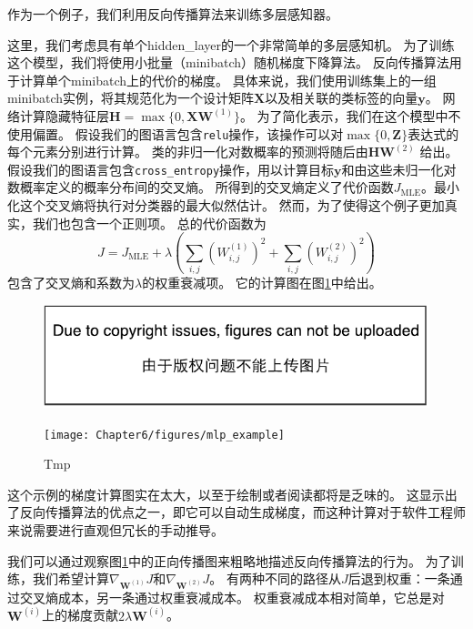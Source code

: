 作为一个例子，我们利用反向传播算法来训练多层感知器。

这里，我们考虑具有单个\gls{hidden_layer}的一个非常简单的多层感知机。
为了训练这个模型，我们将使用小批量（minibatch）随机梯度下降算法。
反向传播算法用于计算单个minibatch上的代价的梯度。
具体来说，我们使用训练集上的一组minibatch实例，将其规范化为一个设计矩阵$\bm{X}$以及相关联的类标签的向量$\bm{y}$。
网络计算隐藏特征层$\bm{H}=\max\{0, \bm{X}\bm{W}^{(1)}\}$。
为了简化表示，我们在这个模型中不使用偏置。
假设我们的图语言包含\verb|relu|操作，该操作可以对$\max\{0,\bm{Z}\}$表达式的每个元素分别进行计算。
类的非归一化对数概率的预测将随后由$\bm{H}\bm{W}^{(2)}$ 给出。
假设我们的图语言包含\verb|cross_entropy|操作，用以计算目标$\bm{y}$和由这些未归一化对数概率定义的概率分布间的交叉熵。
所得到的交叉熵定义了代价函数$J_\text{MLE}$。最小化这个交叉熵将执行对分类器的最大似然估计。
然而，为了使得这个例子更加真实，我们也包含一个正则项。
总的代价函数为
\begin{equation}
  J = J_{\text{MLE}} + \lambda \left ( \sum_{i, j} \left (W_{i, j}^{(1)} \right )^2 + \sum_{i, j} \left (W_{i, j}^{(2)} \right)^2 \right )
\end{equation}
包含了交叉熵和系数为$\lambda$的权重衰减项。
它的计算图在图\ref{fig:chap6_mlp_example}中给出。
\begin{figure}[!htb]
\ifOpenSource
\centerline{\includegraphics{figure.pdf}}
\else
\centerline{\texttt{[image: Chapter6/figures/mlp\_example]}}
\fi
\caption{Tmp}
\label{fig:chap6_mlp_example}
\end{figure}

这个示例的梯度计算图实在太大，以至于绘制或者阅读都将是乏味的。
这显示出了反向传播算法的优点之一，即它可以自动生成梯度，而这种计算对于软件工程师来说需要进行直观但冗长的手动推导。

我们可以通过观察图\ref{fig:chap6_mlp_example}中的正向传播图来粗略地描述反向传播算法的行为。
为了训练，我们希望计算$\nabla_{\bm{W}^{(1)}} J$和$\nabla_{\bm{W}^{(2)}} J$。
有两种不同的路径从$J$后退到权重：一条通过交叉熵成本，另一条通过权重衰减成本。
权重衰减成本相对简单，它总是对$\bm{W}^{(i)}$上的梯度贡献$2\lambda \bm{W}^{(i)}$。
  
  
